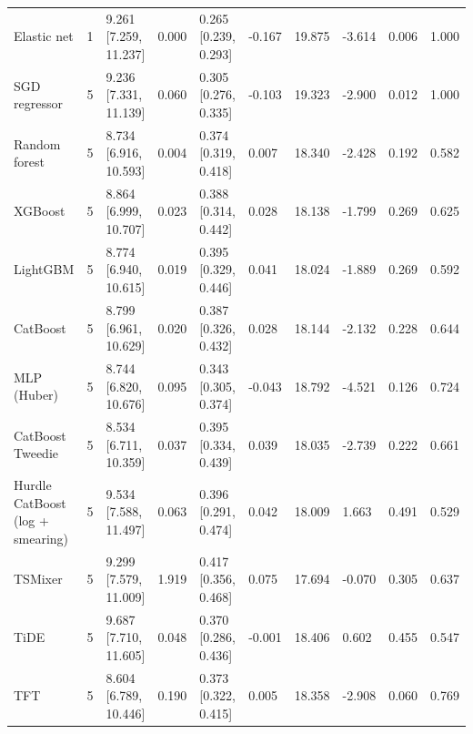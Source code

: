\begin{longtable}{lrllllllll}
Elastic net & 1 & 9.261 [7.259, 11.237] & 0.000 & 0.265 [0.239, 0.293] & -0.167 & 19.875 & -3.614 & 0.006 & 1.000 \\
SGD regressor & 5 & 9.236 [7.331, 11.139] & 0.060 & 0.305 [0.276, 0.335] & -0.103 & 19.323 & -2.900 & 0.012 & 1.000 \\
Random forest & 5 & 8.734 [6.916, 10.593] & 0.004 & 0.374 [0.319, 0.418] & 0.007 & 18.340 & -2.428 & 0.192 & 0.582 \\
XGBoost & 5 & 8.864 [6.999, 10.707] & 0.023 & 0.388 [0.314, 0.442] & 0.028 & 18.138 & -1.799 & 0.269 & 0.625 \\
LightGBM & 5 & 8.774 [6.940, 10.615] & 0.019 & 0.395 [0.329, 0.446] & 0.041 & 18.024 & -1.889 & 0.269 & 0.592 \\
CatBoost & 5 & 8.799 [6.961, 10.629] & 0.020 & 0.387 [0.326, 0.432] & 0.028 & 18.144 & -2.132 & 0.228 & 0.644 \\
MLP (Huber) & 5 & 8.744 [6.820, 10.676] & 0.095 & 0.343 [0.305, 0.374] & -0.043 & 18.792 & -4.521 & 0.126 & 0.724 \\
CatBoost Tweedie & 5 & 8.534 [6.711, 10.359] & 0.037 & 0.395 [0.334, 0.439] & 0.039 & 18.035 & -2.739 & 0.222 & 0.661 \\
Hurdle CatBoost (log + smearing) & 5 & 9.534 [7.588, 11.497] & 0.063 & 0.396 [0.291, 0.474] & 0.042 & 18.009 & 1.663 & 0.491 & 0.529 \\
TSMixer & 5 & 9.299 [7.579, 11.009] & 1.919 & 0.417 [0.356, 0.468] & 0.075 & 17.694 & -0.070 & 0.305 & 0.637 \\
TiDE & 5 & 9.687 [7.710, 11.605] & 0.048 & 0.370 [0.286, 0.436] & -0.001 & 18.406 & 0.602 & 0.455 & 0.547 \\
TFT & 5 & 8.604 [6.789, 10.446] & 0.190 & 0.373 [0.322, 0.415] & 0.005 & 18.358 & -2.908 & 0.060 & 0.769 \\
\end{longtable}
